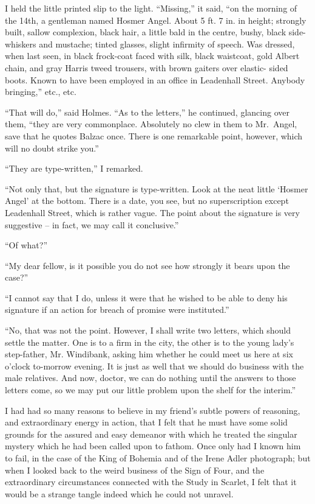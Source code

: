 I held the little printed slip to the light. “Missing,” it
said, “on the morning of the 14th, a gentleman named Hosmer
Angel. About 5 ft. 7 in. in height; strongly built, sallow
complexion, black hair, a little bald in the centre, bushy,
black side-whiskers and mustache; tinted glasses, slight infirmity
of speech. Was dressed, when last seen, in black
frock-coat faced with silk, black waistcoat, gold Albert chain,
and gray Harris tweed trousers, with brown gaiters over elastic-%
sided boots. Known to have been employed in an office in
Leadenhall Street. Anybody bringing,” etc., etc.

“That will do,” said Holmes. “As to the letters,” he continued,
glancing over them, “they are very commonplace.
Absolutely no clew in them to Mr.~Angel, save that he quotes
Balzac once. There is one remarkable point, however, which
will no doubt strike you.”

“They are type-written,” I remarked.

“Not only that, but the signature is type-written. Look at
the neat little ‘Hosmer Angel’ at the bottom. There is a
date, you see, but no superscription except Leadenhall Street,
which is rather vague. The point about the signature is very
suggestive -- in fact, we may call it conclusive.”

“Of what?”

“My dear fellow, is it possible you do not see how strongly
it bears upon the case?”

“I cannot say that I do, unless it were that he wished to
be able to deny his signature if an action for breach of
promise were instituted.”

“No, that was not the point. However, I shall write two
letters, which should settle the matter. One is to a firm in
the city, the other is to the young lady’s step-father, Mr.
Windibank, asking him whether he could meet us here at six
o’clock to-morrow evening. It is just as well that we should
do business with the male relatives. And now, doctor, we
can do nothing until the answers to those letters come, so we
may put our little problem upon the shelf for the interim.”

I had had so many reasons to believe in my friend’s subtle
powers of reasoning, and extraordinary energy in action, that
I felt that he must have some solid grounds for the assured
and easy demeanor with which he treated the singular mystery
which he had been called upon to fathom. Once only had
I known him to fail, in the case of the King of Bohemia and
of the Irene Adler photograph; but when I looked back to the
weird business of the Sign of Four, and the extraordinary
circumstances connected with the Study in Scarlet, I felt that it
would be a strange tangle indeed which he could not unravel.

